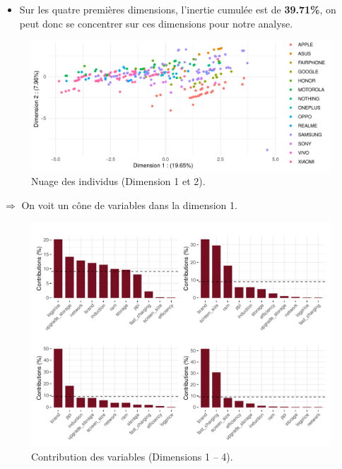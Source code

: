 \documentclass[
  12pt,
]{report}
\providecommand{\tightlist}{%
  \setlength{\itemsep}{0pt}\setlength{\parskip}{0pt}}\usepackage{longtable,booktabs,array}
\begin{document}
\begin{itemize}
\tightlist
\item
  Sur les quatre premières dimensions, l'inertie cumulée est de
  \textbf{39.71\%}, on peut donc se concentrer sur ces dimensions pour
  notre analyse.
\end{itemize}

\begin{figure}[H]

{\centering \includegraphics{report_files/figure-pdf/unnamed-chunk-10-1.pdf}

}

\caption{Nuage des individus (Dimension 1 et 2).}

\end{figure}%

\(\Rightarrow\) On voit un cône de variables dans la dimension 1.

\begin{figure}[H]

{\centering \includegraphics{report_files/figure-pdf/unnamed-chunk-11-1.pdf}

}

\caption{Contribution des variables (Dimensions 1 -- 4).}

\end{figure}%
\end{document}
